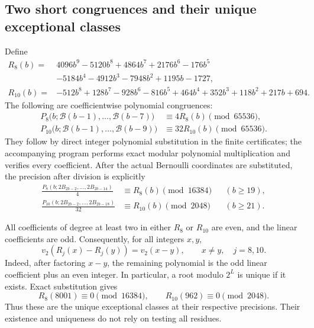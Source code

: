 \subsection{Two short congruences and their unique exceptional classes}

Define
\begin{align*}
 R_8(b)={}&4096b^9-5120b^8+4864b^7+2176b^6-176b^5\\
 &-5184b^4-4912b^3-7948b^2+1195b-1727,\\
 R_{10}(b)={}&-512b^8+128b^7-928b^6-816b^5+464b^4
                  +352b^3+118b^2+217b+694.
\end{align*}
The following are coefficientwise polynomial congruences:
\begin{align}
 P_8\bigl(b;\mathcal B(b-1),\ldots,\mathcal B(b-7)\bigr)
       &\equiv4R_8(b)\pmod{65536},\label{rt:R8}\\
 P_{10}\bigl(b;\mathcal B(b-1),\ldots,\mathcal B(b-9)\bigr)
       &\equiv32R_{10}(b)\pmod{65536}.\label{rt:R10}
\end{align}
They follow by direct integer polynomial substitution in the finite
certificates; the accompanying program performs exact modular
polynomial multiplication and verifies every coefficient. After the
actual Bernoulli coordinates are substituted, the precision after division
is explicitly
\begin{align*}
 \frac{P_8(b;2B_{2b-2},\ldots,2B_{2b-14})}{4}
       &\equiv R_8(b)\pmod{16384} &&(b\ge19),\\
 \frac{P_{10}(b;2B_{2b-2},\ldots,2B_{2b-18})}{32}
       &\equiv R_{10}(b)\pmod{2048} &&(b\ge21).
\end{align*}

All coefficients of degree at least two in either $R_8$ or $R_{10}$
are even, and the linear coefficients are odd. Consequently, for
all integers $x,y$,
\begin{equation}\label{rt:isometry}
 v_2(R_j(x)-R_j(y))=v_2(x-y),\qquad x\ne y,\quad j=8,10.
\end{equation}
Indeed, after factoring $x-y$, the remaining polynomial is the odd
linear coefficient plus an even integer. In particular, a root
modulo $2^L$ is unique if it exists. Exact substitution gives
\[
 R_8(8001)\equiv0\pmod{16384},\qquad
 R_{10}(962)\equiv0\pmod{2048}.
\]
Thus these are the unique exceptional classes at their respective
precisions. Their existence and uniqueness do not rely on testing
all residues.

